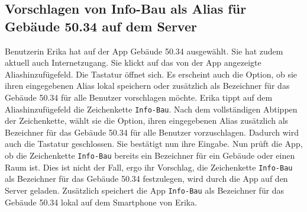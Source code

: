 \subsection{Vorschlagen von Info-Bau als Alias für Gebäude 50.34 auf dem Server}

Benutzerin Erika hat auf der App Gebäude 50.34 ausgewählt. 
Sie hat zudem aktuell auch Internetzugang. 
Sie klickt auf das von der App angezeigte Aliashinzufügefeld. 
Die Tastatur öffnet sich.  
Es erscheint auch die Option, ob sie ihren eingegebenen Alias lokal speichern oder zusätzlich als Bezeichner für das Gebäude 50.34 für alle Benutzer vorschlagen möchte. 
Erika tippt auf dem Aliashinzufügefeld die Zeichenkette \texttt{Info-Bau}.
Nach dem vollständigen Abtippen der Zeichenkette, wählt sie die Option, ihren eingegebenen Alias zusätzlich als Bezeichner für das Gebäude 50.34 für alle Benutzer vorzuschlagen. 
Dadurch wird auch die Tastatur geschlossen. 
Sie bestätigt nun ihre Eingabe. 
Nun prüft die App, ob die Zeichenkette \texttt{Info-Bau} bereits ein Bezeichner für ein Gebäude oder einen Raum ist. 
Dies ist nicht der Fall, ergo ihr Vorschlag, die Zeichenkette \texttt{Info-Bau} als Bezeichner für das Gebäude 50.34 festzulegen, wird durch die App auf den Server geladen. 
Zusätzlich speichert die App \texttt{Info-Bau} als Bezeichner für das Gebäude 50.34 lokal auf dem Smartphone von Erika.